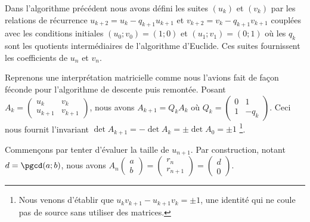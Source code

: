 Dans l'algorithme précédent nous avons défini les suites $(u_k)$ et $(v_k)$ par les relations de récurrence $u_{k+2} = u_k - q_{k+1} u_{k+1}$ et $v_{k+2} = v_k - q_{k+1} v_{k+1}$ couplées avec les conditions initiales  $(u_0 ; v_0) = (1 ; 0)$ et $(u_1 ; v_1) = (0 ; 1)$ où les $q_k$ sont les quotients intermédiaires de l'algorithme d'Euclide.
Ces suites fournissent les coefficients de \bb{} $u_n$ et $v_n$.


\medskip


Reprenons une interprétation matricielle comme nous l'avions fait de façon féconde pour l'algorithme de descente puis remontée. Posant
$A_k = \begin{pmatrix}
			u_k     & v_k     \\
			u_{k+1}	& v_{k+1}	
       \end{pmatrix}$,
nous avons $A_{k+1} = Q_k A_k$ où
$Q_k = \begin{pmatrix}
			0 & 1     \\
			1 & - q_k		
       \end{pmatrix}$.
Ceci nous fournit l'invariant $\det A_{k+1} = - \det A_k = \pm \det A_0 = \pm 1$
\footnote{
 	Nous venons d'établir que  $u_k v_{k+1} - u_{k+1} v_k = \pm 1$, une identité qui ne coule pas de source sans utiliser des matrices.
}.


\medskip


Commençons par tenter d'évaluer la taille de $u_{n+1}$. Par construction, notant $d = \pgcd(a;b)$, nous avons
$A_n
 \begin{pmatrix}
 	a  \\
	b	
 \end{pmatrix}
 =
 \begin{pmatrix}
 	r_n     \\
	r_{n+1}	
 \end{pmatrix}
 =
 \begin{pmatrix}
 	d \\
	0	
 \end{pmatrix}$.


\medskip


